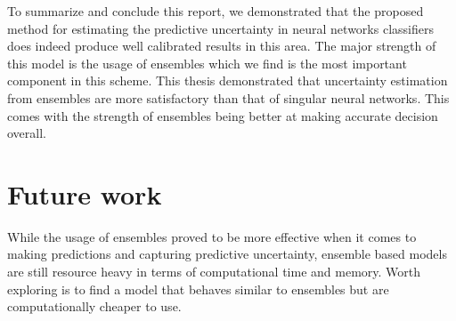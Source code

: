 To summarize and conclude this report, we demonstrated that the proposed method for estimating the predictive uncertainty in neural networks classifiers does indeed produce well calibrated results in this area. The major strength of this model is the usage of ensembles which we find is the most important component in this scheme. This thesis demonstrated that uncertainty estimation from ensembles are more satisfactory than that of singular neural networks. This comes with the strength of ensembles being better at making accurate decision overall. 

\section{Future work}

While the usage of ensembles proved to be more effective when it comes to making predictions and capturing predictive uncertainty, ensemble based models are still resource heavy in terms of computational time and memory. Worth exploring is to find a model that behaves similar to ensembles but are computationally cheaper to use.
